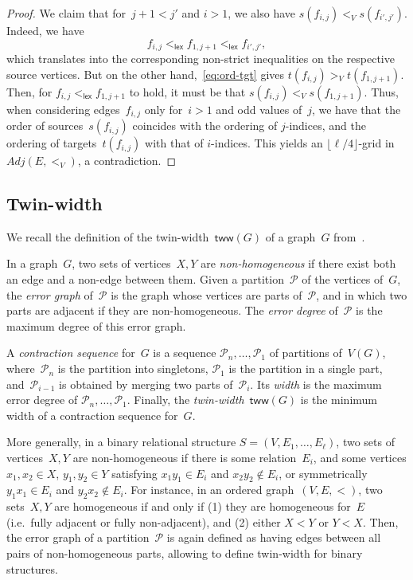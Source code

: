\documentclass[a4paper,UKenglish,cleveref,thm-restate]{lipics-v2021}
\theoremstyle{remark}
\newcommand{\Pc}{\mathcal{P}}
\newcommand{\tww}{\mathsf{tww}}
\newcommand{\lex}{\mathsf{lex}}
\newcommand{\adj}{Adj}
\newcommand{\floor}[1]{\lfloor #1 \rfloor}
\begin{document}
\begin{proof}
    We claim that for~$j+1<j'$ and $i>1$, we also have $s(f_{i,j}) <_V s(f_{i',j'})$.
    Indeed, we have
    \[ f_{i,j} <_\lex f_{1,j+1} <_\lex f_{i',j'}, \]
    which translates into the corresponding non-strict inequalities on the respective source vertices.
    But on the other hand,~\eqref{eq:ord-tgt} gives $t(f_{i,j}) >_V t(f_{1,j+1})$.
    Then, for $f_{i,j} <_\lex f_{1,j+1}$ to hold, it must be that $s(f_{i,j}) <_V s(f_{1,j+1})$.
    Thus, when considering edges~$f_{i,j}$ only for~$i>1$ and odd values of~$j$,
    we have that the order of sources~$s(f_{i,j})$ coincides with the ordering of $j$-indices,
    and the ordering of targets~$t(f_{i,j})$ with that of $i$-indices.
    This yields an $\floor{\ell/4}$-grid in~$\adj(E,<_V)$, a contradiction.
\end{proof}

\subsection{Twin-width}\label{sec:prelim:tww}
We recall the definition of the twin-width~$\tww(G)$ of a graph~$G$ from~\cite{Bonnet2022twinwidth1}.

In a graph~$G$, two sets of vertices~$X,Y$ are \emph{non-homogeneous} if there exist both an edge and a non-edge between them.
Given a partition~$\Pc$ of the vertices of~$G$, the \emph{error graph} of~$\Pc$ is the graph
whose vertices are parts of~$\Pc$, and in which two parts are adjacent if they are non-homogeneous.
The \emph{error degree} of~$\Pc$ is the maximum degree of this error graph.

A \emph{contraction sequence} for~$G$ is a sequence $\Pc_n,\dots,\Pc_1$ of partitions of~$V(G)$,
where~$\Pc_n$ is the partition into singletons, $\Pc_1$ is the partition in a single part,
and~$\Pc_{i-1}$ is obtained by merging two parts of~$\Pc_i$.
Its \emph{width} is the maximum error degree of $\Pc_n,\dots,\Pc_1$.
Finally, the \emph{twin-width}~$\tww(G)$ is the minimum width of a contraction sequence for~$G$.

More generally, in a binary relational structure $S = (V,E_1,\dots,E_\ell)$,
two sets of vertices~$X,Y$ are non-homogeneous if there is some relation~$E_i$,
and some vertices $x_1,x_2 \in X$, $y_1,y_2 \in Y$ satisfying $x_1y_1 \in E_i$ and $x_2y_2 \not\in E_i$,
or symmetrically $y_1x_1 \in E_i$ and $y_2x_2 \not\in E_i$.
For instance, in an ordered graph~$(V,E,<)$, two sets~$X,Y$ are homogeneous if and only if
(1) they are homogeneous for~$E$ (i.e.\ fully adjacent or fully non-adjacent), and (2) either $X < Y$ or $Y < X$.
Then, the error graph of a partition~$\Pc$ is again defined as having edges between all pairs of non-homogeneous parts,
allowing to define twin-width for binary structures.
\end{document}
